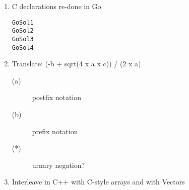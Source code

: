 \documentclass{article}
\begin{document}
\begin{enumerate}
\pagebreak
\item C declarations re-done in Go
\begin{verbatim}
GoSol1
GoSol2
GoSol3
GoSol4
\end{verbatim}
\pagebreak
\item Translate: (-b + sqrt(4 x a x c)) / (2 x a)
\begin{description}
    \item[(a)] postfix notation
    \item[(b)] prefix notation
    \item[(*)] urnary negation?
\end{description}
\pagebreak
\item Interleave in C++ with C-style arrays and with Vectors
\pagebreak
\end{enumerate}
\end{document}
